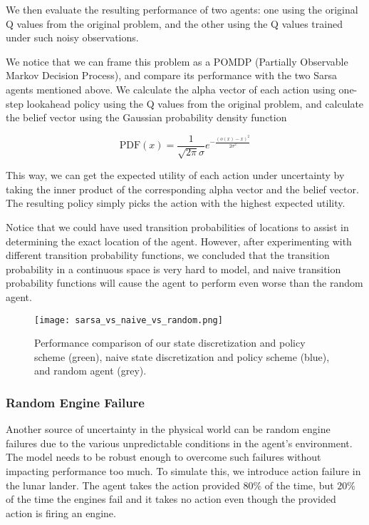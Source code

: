 \documentclass[10pt, conference]{IEEEtran}
\begin{document}
We then evaluate the resulting performance of two agents: one using the original Q values from the original problem, and the other using the Q values trained under such noisy observations. 

We notice that we can frame this problem as a POMDP (Partially Observable Markov Decision Process), and compare its performance with the two Sarsa agents mentioned above. We calculate the alpha vector of each action using one-step lookahead policy using the Q values from the original problem, and calculate the belief vector using the Gaussian probability density function

\begin{equation}
    \text{PDF}(x) = \frac{1}{\sqrt{2\pi}\sigma} e^{-\frac{(o(x) - x)^2}{2\sigma^2}}
\end{equation}

This way, we can get the expected utility of each action under uncertainty by taking the inner product of the corresponding alpha vector and the belief vector. The resulting policy simply picks the action with the highest expected utility.

Notice that we could have used transition probabilities of locations to assist in determining the exact location of the agent. However, after experimenting with different transition probability functions, we concluded that the transition probability in a continuous space is very hard to model, and naive transition probability functions will cause the agent to perform even worse than the random agent. 

\begin{figure}[!t]
    \centering
    \texttt{[image: sarsa\_vs\_naive\_vs\_random.png]}
    \caption{Performance comparison of our state discretization and policy scheme (green), naive state discretization and policy scheme (blue), and random agent (grey).}
    \label{fig:sarsavsnaivevsrandom}
\end{figure}

\subsubsection{Random Engine Failure}
Another source of uncertainty in the physical world can be random engine failures due to the various unpredictable conditions in the agent's environment. The model needs to be robust enough to overcome such failures without impacting performance too much. To simulate this, we introduce action failure in the lunar lander. The agent takes the action provided $80\%$ of the time, but $20\%$ of the time the engines fail and it takes no action even though the provided action is firing an engine. 
\end{document}
